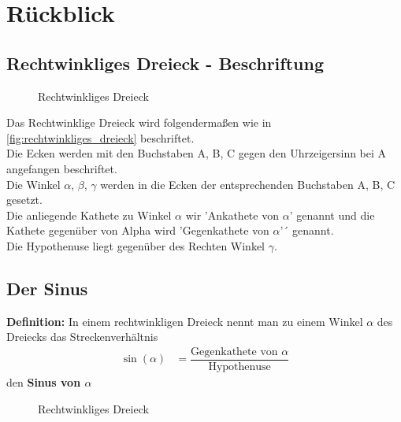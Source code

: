 \section{Rückblick}

\subsection{Rechtwinkliges Dreieck - Beschriftung}
\begin{figure}[hb!]
  \centering
  \def\svgwidth{200px}
  
  \caption{Rechtwinkliges Dreieck}
  \label{fig:rechtwinkliges_dreieck}
\end{figure}
\noindent
Das Rechtwinklige Dreieck wird folgendermaßen wie in \autoref{fig:rechtwinkliges_dreieck} beschriftet. \\
Die Ecken werden mit den Buchstaben A, B, C gegen den Uhrzeigersinn bei A angefangen beschriftet. \\
Die Winkel $\alpha$, $\beta$, $\gamma$ werden in die Ecken der entsprechenden Buchstaben A, B, C gesetzt. \\
Die anliegende Kathete zu Winkel $\alpha$ wir 'Ankathete von $\alpha$' genannt und die Kathete gegenüber von Alpha wird 'Gegenkathete von $\alpha$'´ genannt. \\
Die Hypothenuse liegt gegenüber des Rechten Winkel $\gamma$.

\subsection{Der Sinus}
\textbf{Definition:} In einem rechtwinkligen Dreieck nennt man zu einem Winkel $\alpha$ des Dreiecks das Streckenverhältnis
\begin{align}
  \sin(\alpha) & = \dfrac{\text{Gegenkathete von $\alpha$}}{\text{Hypothenuse}}
\end{align}
den \textbf{Sinus von $\alpha$}
\begin{figure}[hb!]
  \centering
  \def\svgwidth{200px}
  
  \caption{Rechtwinkliges Dreieck}
  \label{fig:rechtwinkliges_dreieck_sinus}
\end{figure}
\newpage

